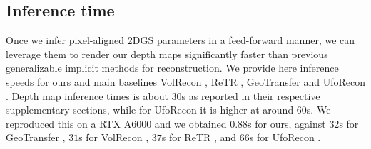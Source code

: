 \subsection{Inference time}
Once we infer pixel-aligned 2DGS parameters in a feed-forward manner, we can leverage them to render our depth maps significantly faster than previous generalizable implicit methods for reconstruction. We provide here inference speeds for ours and main baselines VolRecon \cite{ren2023volrecon}, ReTR \cite{liang2024retr}, GeoTransfer \cite{jena2024geotransfer} and UfoRecon \cite{na2024uforecon}. Depth map inference times is about $30$s as reported in their respective supplementary sections, while for UfoRecon \cite{na2024uforecon} it is higher at around $60$s. We reproduced this on a RTX A$6000$ and we obtained $0.88$s for ours, against $32$s for GeoTransfer \cite{jena2024geotransfer}, $31$s for VolRecon \cite{ren2023volrecon}, $37$s for ReTR \cite{liang2024retr}, and $66$s for UfoRecon \cite{na2024uforecon}.


